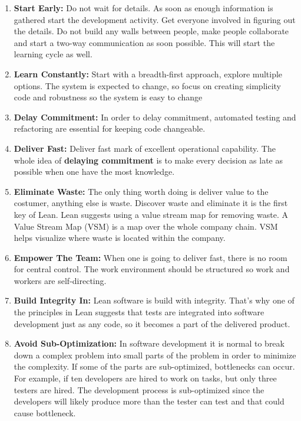 \documentclass[UKenglish]{ifimaster}  %
\begin{document}
\begin{enumerate}
\item \textbf{Start Early:}  Do not wait for details. As soon as enough information is gathered start the development activity. Get everyone involved in figuring out the details. Do not build any walls between people, make people collaborate and start a two-way communication as soon possible. This will start the learning cycle as well.

\item \textbf{Learn Constantly:} Start with a breadth-first approach, explore multiple options. The system is expected to change, so focus on creating simplicity code and robustness so the system is easy to change

\item \textbf{Delay Commitment:} 
In order to delay commitment, automated testing and refactoring are essential for keeping code changeable. 

\item \textbf{Deliver Fast:}
Deliver fast mark of excellent operational capability. The whole idea of \textbf{delaying commitment} is to make every decision as late as possible when one have the most knowledge.
\item \textbf{Eliminate Waste:}
The only thing worth doing is deliver value to the costumer, anything else is waste.  Discover waste and eliminate it is the first key of Lean.  Lean suggests using a value stream map for removing waste. A Value Stream Map (VSM) is a map over the whole company chain. VSM helps visualize where waste is located within the company.
\item \textbf{Empower The Team:} When one is going to deliver fast, there is no room for central control. The work environment should be structured so work and workers are self-directing.

\item \textbf{Build Integrity In:} Lean software is build with integrity. That's why one of the principles in Lean suggests that tests are integrated into software development just as any code, so it becomes a part of the delivered product. 

\item \textbf{Avoid Sub-Optimization:} In software development it is normal to break down a complex problem into small parts of the problem in order to minimize the complexity.  If some of the parts are sub-optimized, bottlenecks can occur. For example, if ten developers are hired to work on tasks, but only three testers are hired. The development process is sub-optimized since the developers will likely produce more than the tester can test and that could cause bottleneck.
\end{enumerate}
\end{document}
